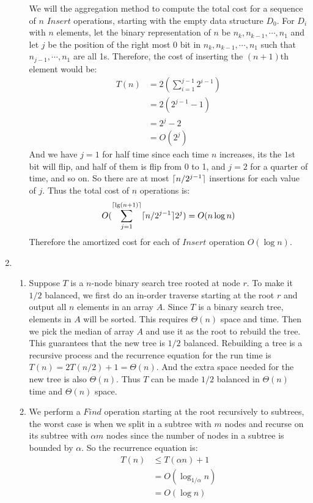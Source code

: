 \documentclass[11pt]{article}
\DeclarePairedDelimiter\ceil{\lceil}{\rceil}
\begin{document}
\begin{enumerate}
\begin{enumerate}
  We will the aggregation method to compute the total cost for a
  sequence of $n$ $Insert$ operations, starting with the empty data
  structure $D_0$. For $D_i$ with $n$ elements, let the binary
  representation of $n$ be $n_k, n_{k-1}, \cdots, n_1$ and let $j$ be
  the position of the right most 0 bit in $n_k, n_{k-1}, \cdots, n_1$
  such that $n_{j-1}, \cdots, n_1$ are all 1s. Therefore, the cost of
  inserting the $(n+1)$th element would be:
  \begin{align}
    T(n) &= 2(\sum_{i=1}^{j-1} 2^{i-1})\\
    &= 2(2^{j-1} - 1)\\
    &= 2^j - 2\\
    &= O(2^j)
  \end{align}
  And we have $j=1$ for half time since each time $n$ increases, its
  the $1$st bit will flip, and half of them is flip from 0 to 1, and
  $j=2$ for a quarter of time, and so on. So there are at most
  $\ceil{n/2^{j-1}}$ insertions for each value of $j$. Thus the total
  cost of $n$ operations is:
  \begin{align}
    O(\sum_{j=1}^{\ceil{\lg (n+1)}} \ceil{n/2^{j-1}} 2^j ) = O(n\log n)
  \end{align}
  Therefore the amortized cost for each of $Insert$ operation $O(\log n)$.
  \end{enumerate}

\item %
\begin{enumerate}
\item %
  Suppose $T$ is a $n$-node binary search tree rooted at node $r$. To
  make it $1/2$ balanced, we first do an in-order traverse starting
  at the root $r$ and output all $n$ elements in an array $A$. Since
  $T$ is a binary search tree, elements in $A$ will be sorted. This
  requires $\Theta(n)$ space and time. Then we pick the median of
  array $A$ and use it as the root to rebuild the tree. This
  guarantees that the new tree is $1/2$ balanced. Rebuilding a tree is
  a recursive process and the recurrence equation for the run time is
  $T(n) = 2T(n/2) + 1 = \Theta(n)$. And the extra space needed for the
  new tree is also $\Theta(n)$. Thus $T$ can be made $1/2$ balanced in
  $\Theta(n)$ time and $\Theta(n)$ space.

\item %
  We perform a $Find$ operation starting at the root recursively to
  subtrees, the worst case is when we split in a subtree with $m$
  nodes and recurse on its subtree with $\alpha m$ nodes since the
  number of nodes in a subtree is bounded by $\alpha$. So the
  recurrence equation is:
  \begin{align}
    T(n) &\leq T(\alpha n) + 1\\
    &= O(\log_{1/\alpha}n)\\
    &=O(\log n)
  \end{align}


\end{enumerate}
\end{enumerate}
\end{document}
